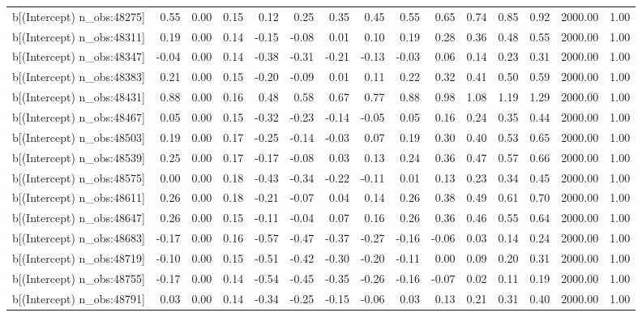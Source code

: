 \begin{table}[ht]
\begin{tabular}{rrrrrrrrrrrrrrr}
  b[(Intercept) n\_obs:48275] & 0.55 & 0.00 & 0.15 & 0.12 & 0.25 & 0.35 & 0.45 & 0.55 & 0.65 & 0.74 & 0.85 & 0.92 & 2000.00 & 1.00 \\ 
  b[(Intercept) n\_obs:48311] & 0.19 & 0.00 & 0.14 & -0.15 & -0.08 & 0.01 & 0.10 & 0.19 & 0.28 & 0.36 & 0.48 & 0.55 & 2000.00 & 1.00 \\ 
  b[(Intercept) n\_obs:48347] & -0.04 & 0.00 & 0.14 & -0.38 & -0.31 & -0.21 & -0.13 & -0.03 & 0.06 & 0.14 & 0.23 & 0.31 & 2000.00 & 1.00 \\ 
  b[(Intercept) n\_obs:48383] & 0.21 & 0.00 & 0.15 & -0.20 & -0.09 & 0.01 & 0.11 & 0.22 & 0.32 & 0.41 & 0.50 & 0.59 & 2000.00 & 1.00 \\ 
  b[(Intercept) n\_obs:48431] & 0.88 & 0.00 & 0.16 & 0.48 & 0.58 & 0.67 & 0.77 & 0.88 & 0.98 & 1.08 & 1.19 & 1.29 & 2000.00 & 1.00 \\ 
  b[(Intercept) n\_obs:48467] & 0.05 & 0.00 & 0.15 & -0.32 & -0.23 & -0.14 & -0.05 & 0.05 & 0.16 & 0.24 & 0.35 & 0.44 & 2000.00 & 1.00 \\ 
  b[(Intercept) n\_obs:48503] & 0.19 & 0.00 & 0.17 & -0.25 & -0.14 & -0.03 & 0.07 & 0.19 & 0.30 & 0.40 & 0.53 & 0.65 & 2000.00 & 1.00 \\ 
  b[(Intercept) n\_obs:48539] & 0.25 & 0.00 & 0.17 & -0.17 & -0.08 & 0.03 & 0.13 & 0.24 & 0.36 & 0.47 & 0.57 & 0.66 & 2000.00 & 1.00 \\ 
  b[(Intercept) n\_obs:48575] & 0.00 & 0.00 & 0.18 & -0.43 & -0.34 & -0.22 & -0.11 & 0.01 & 0.13 & 0.23 & 0.34 & 0.45 & 2000.00 & 1.00 \\ 
  b[(Intercept) n\_obs:48611] & 0.26 & 0.00 & 0.18 & -0.21 & -0.07 & 0.04 & 0.14 & 0.26 & 0.38 & 0.49 & 0.61 & 0.70 & 2000.00 & 1.00 \\ 
  b[(Intercept) n\_obs:48647] & 0.26 & 0.00 & 0.15 & -0.11 & -0.04 & 0.07 & 0.16 & 0.26 & 0.36 & 0.46 & 0.55 & 0.64 & 2000.00 & 1.00 \\ 
  b[(Intercept) n\_obs:48683] & -0.17 & 0.00 & 0.16 & -0.57 & -0.47 & -0.37 & -0.27 & -0.16 & -0.06 & 0.03 & 0.14 & 0.24 & 2000.00 & 1.00 \\ 
  b[(Intercept) n\_obs:48719] & -0.10 & 0.00 & 0.15 & -0.51 & -0.42 & -0.30 & -0.20 & -0.11 & 0.00 & 0.09 & 0.20 & 0.31 & 2000.00 & 1.00 \\ 
  b[(Intercept) n\_obs:48755] & -0.17 & 0.00 & 0.14 & -0.54 & -0.45 & -0.35 & -0.26 & -0.16 & -0.07 & 0.02 & 0.11 & 0.19 & 2000.00 & 1.00 \\ 
  b[(Intercept) n\_obs:48791] & 0.03 & 0.00 & 0.14 & -0.34 & -0.25 & -0.15 & -0.06 & 0.03 & 0.13 & 0.21 & 0.31 & 0.40 & 2000.00 & 1.00 \\ 

\end{tabular}
\end{table}
